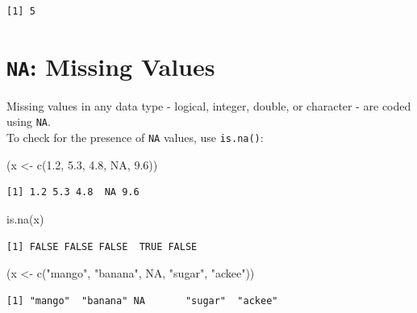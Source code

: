 \documentclass[
]{book}
\newenvironment{Shaded}{\begin{snugshade}}{\end{snugshade}}
\newcommand{\ConstantTok}[1]{\textcolor[rgb]{0.00,0.00,0.00}{#1}}
\newcommand{\FloatTok}[1]{\textcolor[rgb]{0.00,0.00,0.81}{#1}}
\newcommand{\FunctionTok}[1]{\textcolor[rgb]{0.00,0.00,0.00}{#1}}
\newcommand{\NormalTok}[1]{#1}
\newcommand{\OtherTok}[1]{\textcolor[rgb]{0.56,0.35,0.01}{#1}}
\newcommand{\StringTok}[1]{\textcolor[rgb]{0.31,0.60,0.02}{#1}}
\begin{document}
\begin{verbatim}
[1] 5
\end{verbatim}

\hypertarget{na-missing-values}{%
\section{\texorpdfstring{\texttt{NA}: Missing Values}{NA: Missing Values}}\label{na-missing-values}}

Missing values in any data type - logical, integer, double, or character - are coded using \texttt{NA}.\\
To check for the presence of \texttt{NA} values, use \texttt{is.na()}:

\begin{Shaded}
\begin{Highlighting}[]
\NormalTok{(x }\OtherTok{\textless{}{-}} \FunctionTok{c}\NormalTok{(}\FloatTok{1.2}\NormalTok{, }\FloatTok{5.3}\NormalTok{, }\FloatTok{4.8}\NormalTok{, }\ConstantTok{NA}\NormalTok{, }\FloatTok{9.6}\NormalTok{))}
\end{Highlighting}
\end{Shaded}

\begin{verbatim}
[1] 1.2 5.3 4.8  NA 9.6
\end{verbatim}

\begin{Shaded}
\begin{Highlighting}[]
\FunctionTok{is.na}\NormalTok{(x)}
\end{Highlighting}
\end{Shaded}

\begin{verbatim}
[1] FALSE FALSE FALSE  TRUE FALSE
\end{verbatim}

\begin{Shaded}
\begin{Highlighting}[]
\NormalTok{(x }\OtherTok{\textless{}{-}} \FunctionTok{c}\NormalTok{(}\StringTok{"mango"}\NormalTok{, }\StringTok{"banana"}\NormalTok{, }\ConstantTok{NA}\NormalTok{, }\StringTok{"sugar"}\NormalTok{, }\StringTok{"ackee"}\NormalTok{))}
\end{Highlighting}
\end{Shaded}

\begin{verbatim}
[1] "mango"  "banana" NA       "sugar"  "ackee" 
\end{verbatim}
\end{document}
